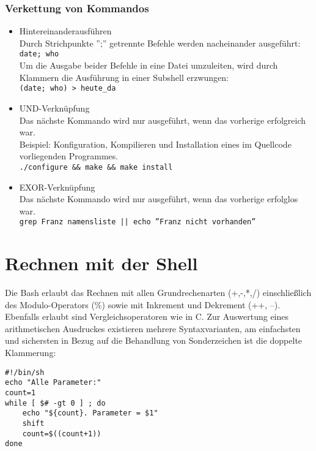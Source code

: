 \documentclass[11pt]{article}
\begin{document}
\subsubsection{Verkettung von Kommandos}
\begin{itemize}
\item{Hintereinanderausführen}\\
Durch Strichpunkte '';'' getrennte Befehle werden nacheinander
ausgeführt:\\
\texttt{date; who}\\
Um die Ausgabe beider Befehle in eine Datei umzuleiten, wird durch
Klammern die Ausführung in einer Subshell erzwungen:\\ 
\texttt{(date; who) >  heute\_da}\\

\item{UND-Verknüpfung}\\
Das nächste Kommando wird nur ausgeführt, wenn das vorherige erfolgreich war.\\
Beispiel: Konfiguration, Kompilieren und Installation eines im Quellcode 
vorliegenden Programmes.\\
\texttt{./configure \&\& make \&\& make install}\\

\item{EXOR-Verknüpfung}\\
Das nächste Kommando wird nur ausgeführt, wenn das vorherige erfolglos war.\\
\texttt{grep Franz namensliste  || echo ''Franz nicht vorhanden''}\\
\end{itemize}

\section{Rechnen mit der Shell}
Die Bash erlaubt das Rechnen mit allen Grundrechenarten (+,-,*,/)
einschließlich des Modulo-Operators (\%) sowie mit Inkrement und 
Dekrement (++, --). Ebenfalls erlaubt sind Vergleichsoperatoren wie in C. Zur
Auswertung eines arithmetischen Ausdruckes existieren mehrere
Syntaxvarianten, am einfachsten und sichersten in Bezug auf die 
Behandlung von Sonderzeichen ist die doppelte Klammerung:

\begin{verbatim}
#!/bin/sh
echo "Alle Parameter:"
count=1
while [ $# -gt 0 ] ; do
	echo "${count}. Parameter = $1"
	shift
	count=$((count+1))
done
\end{verbatim}
\end{document}
